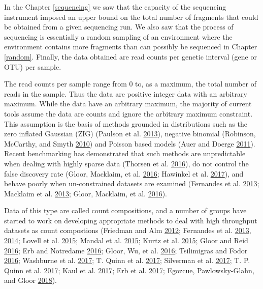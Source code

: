 \documentclass[onecolumn]{book}
\theoremstyle{definition}
\theoremstyle{definition}
\theoremstyle{definition}
\theoremstyle{remark}
\begin{document}
In the Chapter \ref{sequencing} we saw that the capacity of the
sequencing instrument imposed an upper bound on the total number of
fragments that could be obtained from a given sequencing run. We also
saw that the process of sequencing is essentially a random sampling of
an environment where the environment contains more fragments than can
possibly be sequenced in Chapter \ref{random}. Finally, the data
obtained are read counts per genetic interval (gene or OTU) per sample.

The read counts per sample range from 0 to, as a maximum, the total
number of reads in the sample. Thus the data are positive integer data
with an arbitrary maximum. While the data have an arbitrary maximum, the
majority of current tools assume the data are counts and ignore the
arbitrary maximum constraint. This assumption is the basis of methods
grounded in distributions such as the zero inflated Gaussian (ZIG)
(Paulson et al. \protect\hyperlink{ref-Paulson:2013aa}{2013}), negative
binomial (Robinson, McCarthy, and Smyth
\protect\hyperlink{ref-Robinson:2010}{2010}) and Poisson based models
(Auer and Doerge \protect\hyperlink{ref-auer:2011}{2011}). Recent
benchmarking has demonstrated that such methods are unpredictable when
dealing with highly sparse data (Thorsen et al.
\protect\hyperlink{ref-Thorsen:2016aa}{2016}), do not control the false
discovery rate (Gloor, Macklaim, et al.
\protect\hyperlink{ref-gloorAJS:2016}{2016}; Hawinkel et al.
\protect\hyperlink{ref-hawinkel2017}{2017}), and behave poorly when
un-constrained datasets are examined (Fernandes et al.
\protect\hyperlink{ref-fernandes:2013}{2013}; Macklaim et al.
\protect\hyperlink{ref-macklaim:2013}{2013}; Gloor, Macklaim, et al.
\protect\hyperlink{ref-gloorAJS:2016}{2016}).

Data of this type are called count compositions, and a number of groups
have started to work on developing appropriate methods to deal with high
throughput datasets as count compostions (Friedman and Alm
\protect\hyperlink{ref-Friedman:2012}{2012}; Fernandes et al.
\protect\hyperlink{ref-fernandes:2013}{2013},
\protect\hyperlink{ref-fernandes:2014}{2014}; Lovell et al.
\protect\hyperlink{ref-Lovell:2015}{2015}; Mandal et al.
\protect\hyperlink{ref-ancom:2015}{2015}; Kurtz et al.
\protect\hyperlink{ref-Kurtz:2015}{2015}; Gloor and Reid
\protect\hyperlink{ref-Gloor:2016cjm}{2016}; Erb and Notredame
\protect\hyperlink{ref-erb:2016}{2016}; Gloor, Wu, et al.
\protect\hyperlink{ref-gloor2016s}{2016}; Tsilimigras and Fodor
\protect\hyperlink{ref-Tsilimigras:2016aa}{2016}; Washburne et al.
\protect\hyperlink{ref-Washburne:2017aa}{2017}; T. Quinn et al.
\protect\hyperlink{ref-Quinn:2017}{2017}; Silverman et al.
\protect\hyperlink{ref-Silverman:2017aa}{2017}; T. P. Quinn et al.
\protect\hyperlink{ref-Quinn206425}{2017}; Kaul et al.
\protect\hyperlink{ref-Kaul:2017aa}{2017}; Erb et al.
\protect\hyperlink{ref-Erb134536}{2017}; Egozcue, Pawlowsky-Glahn, and
Gloor \protect\hyperlink{ref-egozcue:AJS}{2018}).
\end{document}
